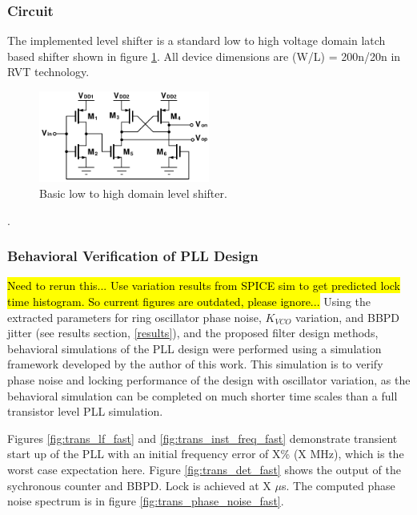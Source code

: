 		\subsubsection{Circuit}
			The implemented level shifter is a standard low to high voltage domain latch based shifter \cite{weste_harris_2011} shown in figure \ref{fig:level_shifter}. All device dimensions are (W/L) = 200n/20n in RVT technology.
			\begin{figure}[htb!]
			        \centering
			        \includegraphics[width=0.5\textwidth, angle=0]{./figs/design/level_shift}
			    \caption{Basic low to high domain level shifter.}
			    \label{fig:level_shifter}
			\end{figure}





{\color{white}.}

	\FloatBarrier

	\subsubsection{Behavioral Verification of PLL Design}
		\hl{Need to rerun this... Use variation results from SPICE sim to get predicted lock time histogram. So current figures are outdated, please ignore...}
		Using the extracted parameters for ring oscillator phase noise, $K_{VCO}$ variation, and BBPD jitter (see results section, \ref{results}), and the proposed filter design methods, behavioral simulations of the PLL design were performed using a simulation framework \cite{Me} developed by the author of this work. This simulation is to verify phase noise and locking performance of the design with oscillator variation, as the behavioral simulation can be completed on much shorter time scales than a full transistor level PLL simulation.

		Figures \ref{fig:trans_lf_fast} and \ref{fig:trans_inst_freq_fast} demonstrate transient start up of the PLL with an initial frequency error of X\% (X MHz), which is the worst case expectation here. Figure \ref{fig:trans_det_fast} shows the output of the sychronous counter and BBPD. Lock is achieved at X $\mu$s. The computed phase noise spectrum is in figure \ref{fig:trans_phase_noise_fast}.

